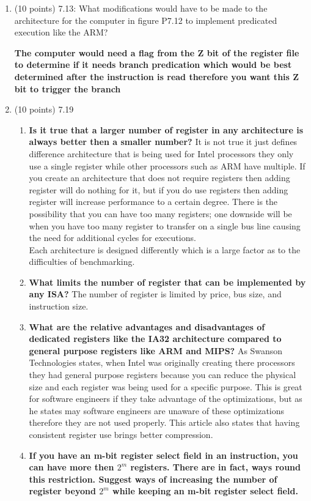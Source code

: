 \documentclass[letterpaper,10pt,onecolumn,titlepage]{article}
\begin{document}
\begin{enumerate}
\begin{mdframed}[style=MyFrame, backgroundcolor=red]
\end{mdframed}
\item (10 points) 7.13: What modifications would have to be made to the architecture for the computer in figure P7.12 to implement predicated execution like the ARM?
\begin{mdframed}[style=MyFrame, backgroundcolor=red]
\textbf{The computer would need a flag from the Z bit of the register file to determine if it needs branch predication which would be best determined after the instruction is read therefore you want this Z bit to trigger the branch  }
\end{mdframed}
\newpage
\item (10 points) 7.19
\begin{mdframed}[style=MyFrame, backgroundcolor=red]
\begin{enumerate}
\item \textbf{Is it true that a larger number of register in any architecture is always better then a smaller number?} It is not true it just defines difference architecture that is being used for Intel processors they only use a single register while other processors such as ARM have multiple.  If you create an architecture that does not require registers then adding register will do nothing for it, but if you do use registers then adding register will increase performance to a certain degree. There is the possibility that you can have too many registers; one downside will be when you have too many register to transfer on a single bus line causing the need for additional cycles for executions. \\ 
Each architecture is designed differently which is a large factor as to the difficulties of benchmarking. 
\item \textbf{What limits the number of register that can be implemented by any ISA? } The number of register is limited by price, bus size, and instruction size.
\item \textbf{What are the relative advantages and disadvantages of dedicated registers like the IA32 architecture compared to general purpose registers like ARM and MIPS?} As Swanson Technologies \cite{Swanson} states, when Intel was originally creating there processors they had general purpose registers because you can reduce the physical size and each register was being used for a specific purpose. This is great for software engineers if they take advantage of the optimizations, but as he states may software engineers are unaware of these optimizations therefore they are not used properly. This article also states that having consistent register use brings better compression. 
\item \textbf{If you have an m-bit register select field in an instruction, you can have more then $2^m$ registers. There are in fact, ways round this restriction. Suggest ways of increasing the number of register beyond $2^m$ while keeping an m-bit register select field.} 
\end{enumerate}
\end{mdframed}


\end{enumerate}
\end{document}
